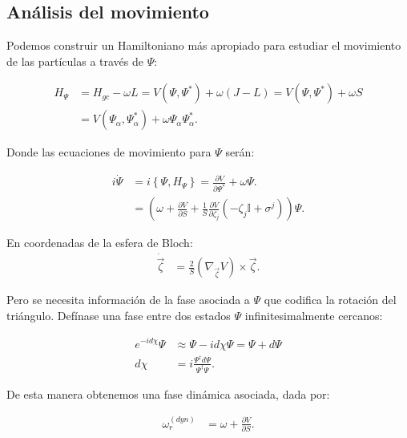\documentclass[xcolor=dvipsnames]{beamer}
\newcommand{\roundP}[1]{\left( #1 \right)}
\newcommand{\poisson}[2]{\left\lbrace #1, #2 \right\rbrace}
\begin{document}
\subsection{Análisis del movimiento}
\begin{frame}
Podemos construir un Hamiltoniano más apropiado para estudiar el movimiento de las partículas a través de $\Psi$:

\begin{align*}
H_{\Psi} &= H_{gc} - \omega L =  V\roundP{\Psi,\Psi^*}+ \omega (J-L) = V\roundP{\Psi,\Psi^*}+ \omega S\\
&= V\roundP{\Psi_\alpha,\Psi_\alpha^*}+ \omega\Psi_\alpha\Psi^*_\alpha.
\end{align*}

Donde las ecuaciones de movimiento para $\Psi$ serán:

\begin{align*}
i\dot{\Psi} &= i\poisson{\Psi}{H_{\Psi}} = \frac{\partial V}{\partial \Psi^*} + \omega \Psi.\\
&= \roundP{\omega +\frac{\partial V}{\partial S}+ \frac{1}{S}\frac{\partial V}{\partial \zeta_j}\roundP{-\zeta_j \mathbb{I}  + \sigma^j }}\Psi.
\end{align*}

\end{frame}
\begin{frame}
En coordenadas de la esfera de Bloch:
\begin{align*}
\dot{\vec{\zeta}} &= \frac{2}{S}\roundP{\nabla_{\vec{\zeta}}V}\times\vec{\zeta}. 
\end{align*}

Pero se necesita información de la fase asociada a $\Psi$ que codifica la rotación del triángulo. Defínase una fase entre dos estados $\Psi$ infinitesimalmente cercanos:

\begin{align*}
e^{-id\chi}\Psi &\approx \Psi -id\chi\Psi = \Psi + d\Psi\\
d\chi &= i\frac{\Psi^\dagger d\Psi}{\Psi^\dagger\Psi}.
\end{align*}

De esta manera obtenemos una fase dinámica asociada, dada por:

\begin{align*}
\omega_r^{(dyn)} &= \omega + \frac{\partial V}{\partial S}.
\end{align*}

\end{frame}
\end{document}
